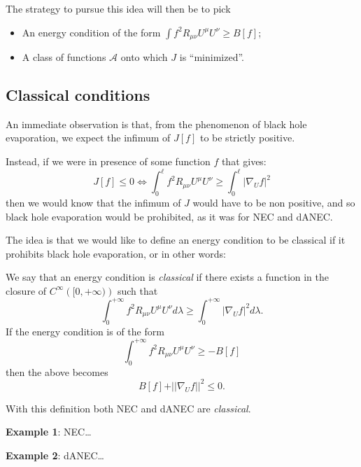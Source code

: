 	The strategy to pursue this idea will then be to pick
	\begin{itemize}
		\item An energy condition of the form \(\int f^2 R_{\mu\nu}U^{\mu}U^{\nu} \ge B[f]\);
		\item A class of functions \(\mathcal{A}\) onto which \(J\) is ``minimized''.
	\end{itemize}

	\subsection{Classical conditions}
	An immediate observation is that, from the phenomenon of black hole evaporation, we expect the infimum of \(J[f]\) to be strictly positive.

	Instead, if we were in presence of some function \(f\) that gives:
	\[
	J[f] \le 0	\iff \int_0^{\ell} f^2 R_{\mu\nu}U^{\mu}U^{\nu} \ge \int_0^{\ell} \vert \nabla_U f\vert^2
	\]
	then we would know that the infimum of \(J\) would have to be non positive, and so black hole evaporation would be prohibited, as it was for NEC and dANEC.

	The idea is that we would like to define an energy condition to be classical if it prohibits black hole evaporation, or in other words:
	\begin{definition}
		\label{def:classical-energy-condition}
		We say that an energy condition is \emph{classical} if there exists a function in the closure of \(C^{\infty}\left([0, +\infty)\right)\) such that
		\[
			\int_0^{+\infty} f^2 R_{\mu\nu}U^{\mu}U^{\nu} d\lambda\ge \int_0^{+\infty} \vert \nabla_U f\vert^2 d\lambda.	
		\]
		If the energy condition is of the form
		\[
			\int_0^{+\infty} f^2 R_{\mu\nu}U^{\mu}U^{\nu} \ge -B[f]	
		\]
		then the above becomes
		\begin{equation}
			\label{eq:definition-classical-condition}
			B[f] + \vert\vert \nabla_U f \vert\vert^2 \le 0.
		\end{equation}
	\end{definition}

	With this definition both NEC and dANEC are \emph{classical}.

	\textbf{Example 1}: NEC\dots

	\textbf{Example 2}: dANEC\dots

